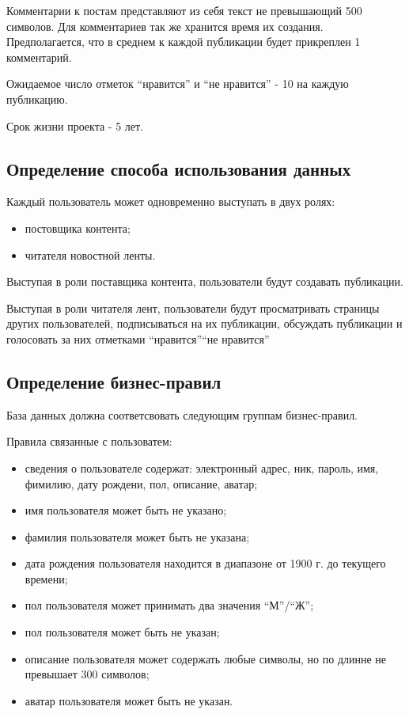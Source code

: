 Комментарии к постам представляют из себя текст не превышающий 500 символов.
Для комментариев так же хранится время их создания.
Предполагается, что в среднем к каждой публикации будет прикреплен 1 комментарий.

Ожидаемое число отметок ``нравится'' и ``не нравится'' - 10 на каждую публикацию.

Срок жизни проекта - 5 лет.

\subsection{Определение способа использования данных}

Каждый пользователь может одновременно выступать в двух ролях:
\begin{itemize}
\item постовщика контента;
\item читателя новостной ленты.
\end{itemize}

Выступая в роли поставщика контента, пользователи будут создавать публикации.

Выступая в роли читателя лент, пользователи будут просматривать страницы других пользователей,
подписываться на их публикации, обсуждать публикации и голосовать за них отметками ``нравится''\/``не нравится''



\subsection{Определение бизнес-правил}
База данных должна соответсвовать следующим группам бизнес-правил.

Правила связанные с пользоватем:
\begin{itemize}
\item сведения о пользователе содержат: электронный адрес, ник, пароль, имя, фимилию, дату рождени, пол, описание, аватар;
\item имя пользователя может быть не указано;
\item фамилия пользователя может быть не указана;
\item дата рождения пользователя находится в диапазоне от 1900 г. до текущего времени;
\item пол пользователя может принимать два значения ``М''/``Ж'';
\item пол пользователя может быть не указан;
\item описание пользователя может содержать любые символы, но по длинне не превышает 300 символов;
\item аватар пользователя может быть не указан.
\end{itemize}

